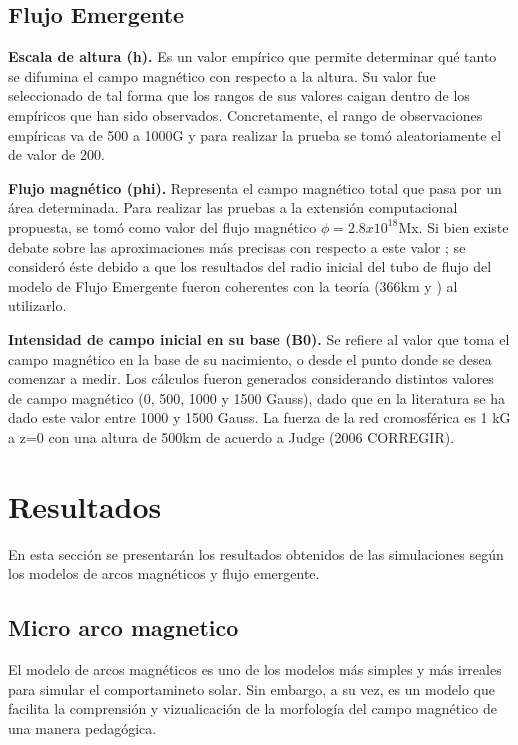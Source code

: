 \subsection{Flujo Emergente}

\textbf{Escala de altura (h). }Es un valor emp\'irico que permite determinar qu\'e tanto se difumina el campo magn\'etico con respecto a la altura. Su valor fue seleccionado de tal forma que los rangos de sus valores caigan dentro de los emp\'iricos que han sido observados. Concretamente, el rango de observaciones emp\'iricas va de 500 a 1000G \citep{VAULT} y para realizar la prueba se tom\'o aleatoriamente el de valor de 200.

\textbf{Flujo magn\'etico (phi). }Representa el campo magn\'etico total que pasa por un \'area determinada. Para realizar las pruebas a la extensi\'on computacional propuesta, se tom\'o como valor del flujo magn\'etico $\phi=2.8x10^{18}$Mx. Si bien existe debate sobre las aproximaciones m\'as precisas con respecto a este valor \citep{magneticflux}; se consider\'o \'este debido a que los resultados del radio inicial del tubo de flujo del modelo de Flujo Emergente fueron coherentes con la teor\'ia (366km \citep{magneticflux} y \citep{VAULT}) al utilizarlo.

\textbf{Intensidad de campo inicial en su base (B0). }Se refiere al valor que toma el campo magn\'etico en la base de su nacimiento, o desde el punto donde se desea comenzar a medir. Los c\'alculos fueron generados considerando distintos valores de campo magn\'etico (0, 500, 1000 y 1500 Gauss), dado que en la literatura se ha dado este valor entre 1000 y 1500 Gauss. La fuerza de la red cromosf\'erica es 1 kG a z=0 con una altura de 500km de acuerdo a Judge (2006 CORREGIR).

\clearpage
\section{Resultados}

En esta secci\'on se presentar\'an los resultados obtenidos de las simulaciones seg\'un los modelos de arcos magn\'eticos y flujo emergente.

\subsection{Micro arco magnetico}
El modelo de arcos magn\'eticos es uno de los modelos m\'as simples y m\'as irreales para simular el comportamineto solar. Sin embargo, a su vez, es un modelo que facilita la comprensi\'on y vizualicaci\'on de la morfolog\'ia del campo magn\'etico de una manera pedag\'ogica.

